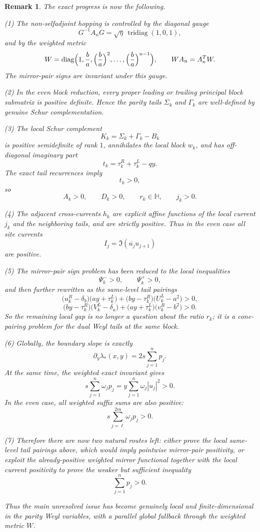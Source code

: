 \documentclass[11pt]{article}
\newtheorem{remark}[theorem]{Remark}
\newcommand{\HH}{\mathbb H}
\begin{document}
\begin{remark}
The exact progress is now the following.

\smallskip
\noindent
\textup{(1)} The non-selfadjoint hopping is controlled by the diagonal gauge
\[
G^{-1}A_nG=\sqrt{\eta}\,\operatorname{tridiag}(1,0,1),
\]
and by the weighted metric
\[
W=\operatorname{diag}\Bigl(1,\frac ba,\Bigl(\frac ba\Bigr)^2,\dots,
\Bigl(\frac ba\Bigr)^{n-1}\Bigr),
\qquad
WA_n=A_n^T W.
\]
The mirror-pair signs are invariant under this gauge.

\smallskip
\noindent
\textup{(2)} In the even block reduction, every proper leading or trailing principal block
submatrix is positive definite. Hence the parity tails \(\Sigma_k\) and \(\Gamma_k\) are
well-defined by genuine Schur complementation.

\smallskip
\noindent
\textup{(3)} The local Schur complement
\[
K_k=\Sigma_k+\Gamma_k-B_k
\]
is positive semidefinite of rank \(1\), annihilates the local block \(w_k\), and has
off-diagonal imaginary part
\[
t_k=\tau_k^R+\tau_k^L-qy.
\]
The exact tail recurrences imply
\[
t_k>0,
\]
so
\[
A_k>0,\qquad D_k>0,\qquad r_k\in\HH,\qquad j_k>0.
\]

\smallskip
\noindent
\textup{(4)} The adjacent cross-currents \(h_k\) are explicit affine functions of the local
current \(j_k\) and the neighboring tails, and are strictly positive. Thus in the even case all
site currents
\[
I_j=\Im(\overline{u_j}u_{j+1})
\]
are positive.

\smallskip
\noindent
\textup{(5)} The mirror-pair sign problem has been reduced to the local inequalities
\[
\Psi_k^- >0,\qquad \Psi_k^+>0,
\]
and then further rewritten as the same-level tail pairings
\[
\bigl(u_k^R-\delta_b\bigr)\bigl(ay+\tau_k^L\bigr)
+
\bigl(by-\tau_k^R\bigr)\bigl(U_k^L-a^2\bigr)>0,
\]
\[
\bigl(by-\tau_k^R\bigr)\bigl(V_k^L-\delta_a\bigr)
+
\bigl(ay+\tau_k^L\bigr)\bigl(v_k^R-b^2\bigr)>0.
\]
So the remaining local gap is no longer a question about the ratio \(r_k\); it is a cone-pairing
problem for the dual Weyl tails at the same block.

\smallskip
\noindent
\textup{(6)} Globally, the boundary slope is exactly
\[
\partial_y\lambda_*(x,y)=2s\sum_{j=1}^n p_j.
\]
At the same time, the weighted exact invariant gives
\[
s\sum_{j=1}^n \omega_j p_j
=
y\sum_{j=1}^n \omega_j |u_j|^2
>0.
\]
In the even case, all weighted suffix sums are also positive:
\[
s\sum_{j=\ell}^{2m}\omega_j p_j>0.
\]

\smallskip
\noindent
\textup{(7)} Therefore there are now two natural routes left:
either prove the local same-level tail pairings above, which would imply pointwise mirror-pair
positivity, or exploit the already-positive weighted mirror functional together with the local
current positivity to prove the weaker but sufficient inequality
\[
\sum_{j=1}^n p_j>0.
\]

\smallskip
\noindent
Thus the main unresolved issue has become genuinely local and finite-dimensional in the parity
Weyl variables, with a parallel global fallback through the weighted metric \(W\).
\end{remark}
\end{document}

